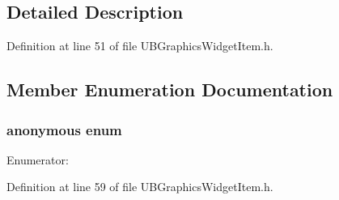 \subsection{Detailed Description}


Definition at line 51 of file U\-B\-Graphics\-Widget\-Item.\-h.



\subsection{Member Enumeration Documentation}
\hypertarget{class_u_b_graphics_widget_item_a87fa860d4a5f30733ad0a69b808376cd}{\subsubsection[{anonymous enum}]{\setlength{\rightskip}{0pt plus 5cm}anonymous enum}}\label{d0/d16/class_u_b_graphics_widget_item_a87fa860d4a5f30733ad0a69b808376cd}
\begin{Desc}
\item[Enumerator\-: ]\par
\begin{description}
\item[{\em 
\hypertarget{class_u_b_graphics_widget_item_a87fa860d4a5f30733ad0a69b808376cda3246eda160045d14b903c6d2da6146b6}{Type}\label{d0/d16/class_u_b_graphics_widget_item_a87fa860d4a5f30733ad0a69b808376cda3246eda160045d14b903c6d2da6146b6}
}]\end{description}
\end{Desc}



Definition at line 59 of file U\-B\-Graphics\-Widget\-Item.\-h.

